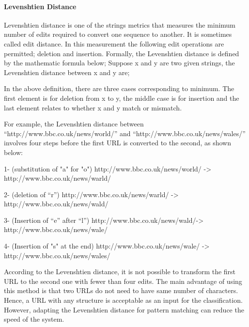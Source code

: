 \paragraph{Levenshtien Distance}
	
Levenshtien distance is one of the strings metrics that measures the minimum number of edits required to convert one sequence to another. It is sometimes called edit distance. In this measurement the following edit operations are permitted; deletion and insertion. 
Formally, the Levenshtien distance is defined by the mathematic formula below;
Suppose x and y are two given strings, the Levenshtien distance between x and y are;
%


%
In the above definition, there are three cases corresponding to minimum. The first element is for deletion from x to y, the middle case is for insertion and the last element relates to whether x and y match or mismatch\cite{Levenshtein}.  

For example, the Levenshtien distance between “http://www.bbc.co.uk/news/world/” and “http://www.bbc.co.uk/news/wales/” involves four steps before the first URL is converted to the second, as shown below:

1-	(substitution of "a" for "o")
http://www.bbc.co.uk/news/world/ -> http://www.bbc.co.uk/news/warld/

2-	(deletion of “r”)
http://www.bbc.co.uk/news/warld/ -> http://www.bbc.co.uk/news/wald/

3-	(Insertion of “e” after “l”)
http://www.bbc.co.uk/news/wald/-> http://www.bbc.co.uk/news/wale/

4-	(Insertion of "s" at the end)
http://www.bbc.co.uk/news/wale/ -> http://www.bbc.co.uk/news/wales/

According to the Levenshtien distance, it is not possible to transform the first URL to the second one with fewer than four edits. The main advantage of using this method is that two URLs do not need to have same number of characters. Hence, a URL with any structure is acceptable as an input for the classification. However, adapting the Levenshtien distance for pattern matching can reduce the speed of the system.


